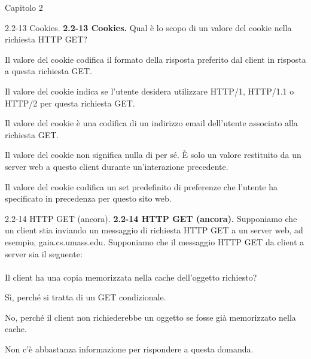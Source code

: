\documentclass[a4paper]{article}
\begin{document}
\begin{quiz}{Capitolo 2}
\begin{multi}[points=1,shuffle]{2.2-13 Cookies.}
\textbf{2.2-13 Cookies.} Qual è lo scopo di un valore del cookie nella richiesta HTTP GET?
\item Il valore del cookie codifica il formato della risposta preferito dal client in risposta a questa richiesta GET.
\item Il valore del cookie indica se l'utente desidera utilizzare HTTP/1, HTTP/1.1 o HTTP/2 per questa richiesta GET.
\item Il valore del cookie è una codifica di un indirizzo email dell'utente associato alla richiesta GET.
\item* Il valore del cookie non significa nulla di per sé. È solo un valore restituito da un server web a questo client durante un'interazione precedente.
\item Il valore del cookie codifica un set predefinito di preferenze che l'utente ha specificato in precedenza per questo sito web.
\end{multi}
    

\begin{multi}[points=1,shuffle]{2.2-14 HTTP GET (ancora).}
\textbf{2.2-14 HTTP GET (ancora).} 
Supponiamo che un client stia inviando un messaggio di richiesta HTTP GET a un server web, ad esempio, gaia.cs.umass.edu. 
Supponiamo che il messaggio HTTP GET da client a server sia il seguente: \\

\\

Il client ha una copia memorizzata nella cache dell'oggetto richiesto?
\item* Sì, perché si tratta di un GET condizionale.
\item No, perché il client non richiederebbe un oggetto se fosse già memorizzato nella cache.
\item Non c'è abbastanza informazione per rispondere a questa domanda.
\end{multi}
    


\end{quiz}
\end{document}
